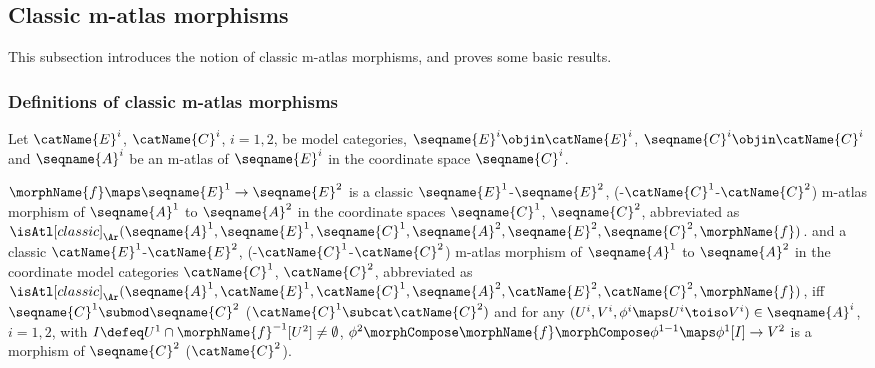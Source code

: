 \documentclass{article}
\begin{document}
\subsection{Classic m-atlas morphisms}
\label{sub:M-ATLcmorph}
This subsection introduces the notion of classic m-atlas morphisms, and
proves some basic results.

\subsubsection{Definitions of classic m-atlas morphisms}
\begin{definition}
\label{def:M-ATLcmorph}
Let $\catName{E}^i$, $\catName{C}^i$, $i=1,2$, be model categories,
$\seqname{E}^i \objin \catName{E}^i$,
$\seqname{C}^i \objin \catName{C}^i$
and $\seqname{A}^i$ be an m-atlas
of $\seqname{E}^i$ in the coordinate space $\seqname{C}^i$.

$\morphName{f} \maps \seqname{E}^1 \to \seqname{E}^2$ is a classic
\nobreaks
  {
    {$\seqname{E}^1$-$\seqname{E}^2$},
    {(-$\catName{C}^1$-$\catName{C}^2$)}
  }
m-atlas morphism of $\seqname{A}^1$ to $\seqname{A}^2$ in the coordinate
spaces $\seqname{C}^1$, $\seqname{C}^2$, abbreviated as
$
  \isAtl[classic]_\Ar
  (
    \seqname{A}^1,
    \seqname{E}^1,
    \seqname{C}^1,
    \seqname{A}^2,
    \seqname{E}^2,
    \seqname{C}^2,
    \morphName{f}
  )
$.
and a classic
\nobreaks
 {
   {$\catName{E}^1$-$\catName{E}^2$},
   {(-$\catName{C}^1$-$\catName{C}^2$)}
  }
m-atlas morphism of $\seqname{A}^1$ to $\seqname{A}^2$ in the coordinate
model categories $\catName{C}^1$, $\catName{C}^2$, abbreviated as
$
  \isAtl[classic]_\Ar
  (
    \seqname{A}^1,
    \catName{E}^1,
    \catName{C}^1,
    \seqname{A}^2,
    \catName{E}^2,
    \catName{C}^2,
    \morphName{f}
  )
$,
iff
\nobreaks
  {{
    $\seqname{C}^1 \submod \seqname{C}^2$
  }}
($\catName{C}^1 \subcat \catName{C}^2)$
and for any $(U^i, V^i, \phi^i \maps U^i \toiso V^i) \in \seqname{A}^i$,
$i=1,2$, with $I \defeq U^1 \cap \morphName{f}^{-1}[U^2] \neq \emptyset$,
$
  \phi^2 \morphCompose \morphName{f} \morphCompose \phi^{1-1} \maps
    \phi^1[I] \to V^2
$
is a morphism of $\seqname{C}^2$ ($\catName{C}^2$).


\end{definition}
\end{document}

